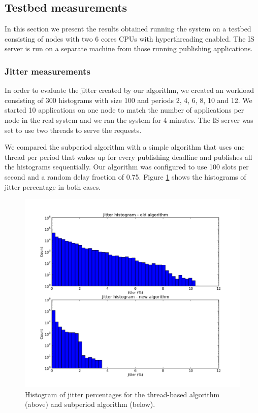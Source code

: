 \subsection*{Testbed measurements}
In this section we present the results obtained running the system on a testbed consisting of nodes with two 6 cores CPUs with hyperthreading enabled. The IS server is run on a separate machine from those running publishing applications.

\subsubsection*{Jitter measurements}

In order to evaluate the jitter created by our algorithm, we created an workload consisting of 300 histograms with size 100 and periods 2, 4, 6, 8, 10 and 12. We started 10 applications on one node to match the number of applications per node in the real system and we ran the system for 4 minutes. The IS server was set to use two threads to serve the requests.

We compared the subperiod algorithm with a simple algorithm that uses one thread per period that wakes up for every publishing deadline and publishes all the histograms sequentially. Our algorithm was configured to use 100 slots per second and a random delay fraction of 0.75. Figure \ref{fig:jitter_histo} shows the histograms of jitter percentage in both cases.

\begin{figure}[ht]
\centering
\includegraphics[scale=0.6]{Images/jitter_histo.png}
\caption{Histogram of jitter percentages for the thread-based algorithm (above) and subperiod algorithm (below).}
\label{fig:jitter_histo}
\end{figure}

